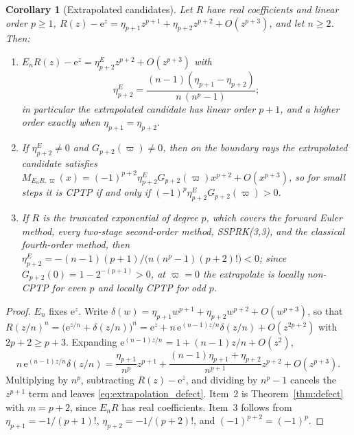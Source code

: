 \documentclass[pdflatex,sn-mathphys-num]{sn-jnl}
\newcommand{\e}{\mathrm{e}}
\theoremstyle{thmstyleone}
\newtheorem{corollary}[theorem]{Corollary}
\theoremstyle{thmstylethree}
\theoremstyle{thmstyletwo}
\begin{document}
\begin{corollary}[Extrapolated candidates]\label{cor:extrapolation}
Let $R$ have real coefficients and linear order $p\ge1$, $R(z)-\e^z=\eta_{p+1}z^{p+1}+\eta_{p+2}z^{p+2}+O(z^{p+3})$, and let $n\ge2$. Then:
\begin{enumerate}
 \item $E_nR(z)-\e^z=\eta^E_{p+2}z^{p+2}+O(z^{p+3})$ with
 \begin{equation}
  \eta^E_{p+2}=\frac{(n-1)(\eta_{p+1}-\eta_{p+2})}{n\,(n^p-1)};
  \label{eq:extrapolation_defect}
 \end{equation}
 in particular the extrapolated candidate has linear order $p+1$, and a higher order exactly when $\eta_{p+1}=\eta_{p+2}$.
 \item If $\eta^E_{p+2}\ne0$ and $G_{p+2}(\varpi)\ne0$, then on the boundary rays the extrapolated candidate satisfies $M_{E_nR,\varpi}(x)=(-1)^{p+2}\eta^E_{p+2}G_{p+2}(\varpi)x^{p+2}+O(x^{p+3})$, so for small steps it is CPTP if and only if $(-1)^p\eta^E_{p+2}G_{p+2}(\varpi)>0$.
 \item If $R$ is the truncated exponential of degree $p$, which covers the forward Euler method, every two-stage second-order method, SSPRK(3,3), and the classical fourth-order method, then
 $\eta^E_{p+2}=-(n-1)(p+1)/\big(n(n^p-1)(p+2)!\big)<0$; since $G_{p+2}(0)=1-2^{-(p+1)}>0$, at $\varpi=0$ the extrapolate is locally non-CPTP for even $p$ and locally CPTP for odd $p$.
\end{enumerate}
\end{corollary}

\begin{proof}
$E_n$ fixes $\e^z$. Write $\delta(w)=\eta_{p+1}w^{p+1}+\eta_{p+2}w^{p+2}+O(w^{p+3})$, so that $R(z/n)^n=\big(\e^{z/n}+\delta(z/n)\big)^n=\e^z+n\,\e^{(n-1)z/n}\delta(z/n)+O(z^{2p+2})$ with $2p+2\ge p+3$. Expanding $\e^{(n-1)z/n}=1+(n-1)z/n+O(z^2)$,
\[
 n\,\e^{(n-1)z/n}\delta(z/n)=\frac{\eta_{p+1}}{n^p}z^{p+1}+\frac{(n-1)\eta_{p+1}+\eta_{p+2}}{n^{p+1}}z^{p+2}+O(z^{p+3}).
\]
Multiplying by $n^p$, subtracting $R(z)-\e^z$, and dividing by $n^p-1$ cancels the $z^{p+1}$ term and leaves \eqref{eq:extrapolation_defect}. Item~2 is Theorem~\ref{thm:defect} with $m=p+2$, since $E_nR$ has real coefficients. Item~3 follows from $\eta_{p+1}=-1/(p+1)!$, $\eta_{p+2}=-1/(p+2)!$, and $(-1)^{p+2}=(-1)^p$.
\end{proof}
\end{document}
